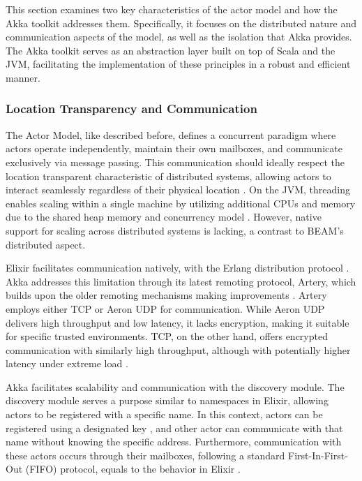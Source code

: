 This section examines two key characteristics of the actor model and how the Akka toolkit addresses them. Specifically, it focuses on the distributed nature and communication aspects of the model, as well as the isolation that Akka provides. The Akka toolkit serves as an abstraction layer built on top of Scala and the \gls{JVM}, facilitating the implementation of these principles in a robust and efficient manner.

\subsubsection{Location Transparency and Communication}

The Actor Model, like described before, defines a concurrent paradigm where actors operate independently, maintain their own mailboxes, and communicate exclusively via message passing. This communication should ideally respect the location transparent characteristic of distributed systems, allowing actors to interact seamlessly regardless of their physical location \cite{Armstrong2013}. On the JVM, threading enables scaling within a single machine by utilizing additional CPUs and memory due to the shared heap memory and concurrency model \cite{Abraham2023}. However, native support for scaling across distributed systems is lacking, a contrast to BEAM’s distributed aspect.

Elixir facilitates communication natively, with the Erlang distribution protocol \cite{elixir-school}. Akka addresses this limitation through its latest remoting protocol, Artery, which builds upon the older remoting mechanisms making improvements \cite{akka-docs,Abraham2023}. Artery employs either \gls{TCP} or Aeron UDP for communication. While Aeron UDP delivers high throughput and low latency, it lacks encryption, making it suitable for specific trusted environments. \gls{TCP}, on the other hand, offers encrypted communication with similarly high throughput, although with potentially higher latency under extreme load \cite{akka-docs}.

Akka facilitates scalability and communication with the discovery module. The discovery module serves a purpose similar to namespaces in Elixir, allowing actors to be registered with a specific name. In this context, actors can be registered using a designated key \cite{Abraham2023}, and other actor can communicate with that name without knowing the specific address. Furthermore, communication with these actors occurs through their mailboxes, following a standard First-In-First-Out (FIFO) protocol, equals to the behavior in Elixir \cite{Moamen2027,Juric2024}.

